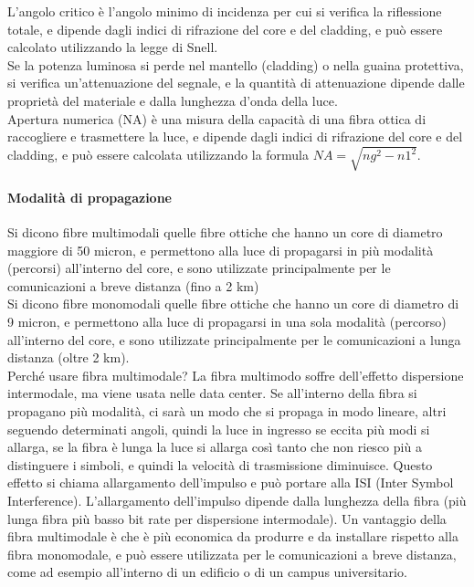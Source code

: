 L'angolo critico è l'angolo minimo di incidenza per cui si verifica la riflessione totale, e dipende dagli indici di rifrazione del core e del cladding, e può essere calcolato utilizzando 
la legge di Snell.\\

Se la potenza luminosa si perde nel mantello (cladding) o nella guaina protettiva, si verifica un'attenuazione del segnale, e la quantità di attenuazione dipende dalle proprietà del materiale 
e dalla lunghezza d'onda della luce.\\

Apertura numerica (NA) è una misura della capacità di una fibra ottica di raccogliere e trasmettere la luce, e dipende dagli indici di rifrazione del core e del cladding, e può essere calcolata 
utilizzando la formula $NA = \sqrt{ng^2 - n1^2}$.\\

\paragraph{Modalità di propagazione}
Si dicono fibre multimodali quelle fibre ottiche che hanno un core di diametro maggiore di 50 micron, e permettono alla luce di propagarsi in più modalità (percorsi) all'interno del core, e sono
utilizzate principalmente per le comunicazioni a breve distanza (fino a 2 km)\\
Si dicono fibre monomodali quelle fibre ottiche che hanno un core di diametro di 9 micron, e permettono alla luce di propagarsi in una sola modalità (percorso) all'interno del core, 
e sono utilizzate principalmente per le comunicazioni a lunga distanza (oltre 2 km).\\

Perché usare fibra multimodale?
La fibra multimodo soffre dell'effetto dispersione intermodale, ma viene usata nelle data center. Se all'interno della fibra si propagano più modalità, ci sarà un modo che si propaga in modo lineare, 
altri seguendo determinati angoli, quindi la luce in ingresso se eccita più modi si allarga, se la fibra è lunga la luce si allarga così tanto che non riesco più a distinguere i simboli, 
e quindi la velocità di trasmissione diminuisce. Questo effetto si chiama allargamento dell'impulso e può portare alla ISI (Inter Symbol Interference). L'allargamento dell'impulso dipende dalla 
lunghezza della fibra (più lunga fibra più basso bit rate per dispersione intermodale). Un vantaggio della fibra multimodale è che è più economica da produrre e da installare rispetto alla fibra 
monomodale, e può essere utilizzata per le comunicazioni a breve distanza, come ad esempio all'interno di un edificio o di un campus universitario.\\

